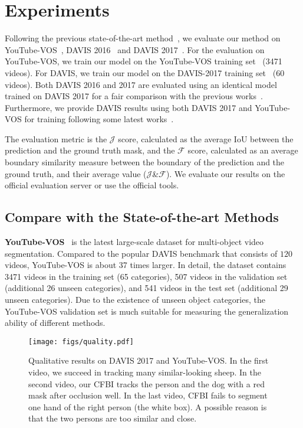 \documentclass[runningheads]{llncs}
\begin{document}
\section{Experiments}

Following the previous state-of-the-art method~\cite{spacetime},
we evaluate our method on YouTube-VOS~\cite{youtubevos}, DAVIS 2016~\cite{davis2016} and DAVIS 2017~\cite{davis2017}. For the evaluation on YouTube-VOS, we train our model on the YouTube-VOS training set~\cite{youtubevos} (3471 videos). For DAVIS, we train our model on the DAVIS-2017 training set~\cite{davis2017} (60 videos). Both DAVIS 2016 and 2017 are evaluated using an identical model trained on DAVIS 2017 for a fair comparison with the previous works~\cite{feelvos,spacetime}. Furthermore, we provide DAVIS results using both DAVIS 2017 and YouTube-VOS for training following some latest works~\cite{feelvos,spacetime}.

\setlength{\intextsep}{0pt}

The evaluation metric is the $\mathcal{J}$ score, calculated as the average IoU between the prediction and the ground truth mask, and the $\mathcal{F}$ score, calculated as an average boundary similarity measure between the boundary of the prediction and the ground truth, and their average value ($\mathcal{J}$\&$\mathcal{F}$). We evaluate our results on the official evaluation server or use the official tools.






\subsection{Compare with the State-of-the-art Methods}



\noindent \textbf{YouTube-VOS}~\cite{youtubevos} is the latest large-scale dataset for multi-object video segmentation. Compared to the popular DAVIS benchmark that consists of $120$ videos, YouTube-VOS is about 37 times larger. In detail, the dataset contains 3471 videos in the training set (65 categories), 507 videos in the validation set (additional 26 unseen categories), and 541 videos in the test set (additional 29 unseen categories). Due to the existence of unseen object categories, the YouTube-VOS validation set is much suitable for measuring the generalization ability of different methods. 

\begin{figure}[t!]
    \centering
    \texttt{[image: figs/quality.pdf]}
    \caption{Qualitative results on DAVIS 2017 and YouTube-VOS. In the first video, we succeed in tracking many similar-looking sheep. In the second video, our CFBI tracks the person and the dog with a red mask after occlusion well. In the last video, CFBI fails to segment one hand of the right person (the white box). A possible reason is that the two persons are too similar and close.}
    \label{fig:quality}
\end{figure}
\end{document}
